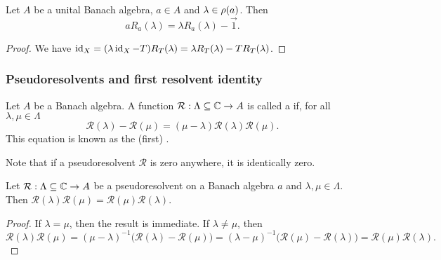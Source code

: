\begin{lemma} \label{BanachAlgebraResolventMultiplication}
Let $A$ be a unital Banach algebra, $a\in A$ and $\lambda\in\rho(a)$. Then
\[ aR_a(\lambda) = \lambda R_a(\lambda) - \vec{1}. \]
\end{lemma}
\begin{proof}
We have $\operatorname{id}_X = (\lambda \operatorname{id}_X - T)R_T(\lambda) = \lambda R_T(\lambda) - TR_T(\lambda)$.
\end{proof}

\subsubsection{Pseudoresolvents and first resolvent identity}
\begin{definition}
Let $A$ be a Banach algebra. A function $\mathcal{R}:\Lambda \subseteq \mathbb{C} \to A$ is called a  if, for all $\lambda,\mu\in\Lambda$
\[ \mathcal{R}(\lambda) - \mathcal{R}(\mu) = (\mu-\lambda)\mathcal{R}(\lambda)\mathcal{R}(\mu). \]
This equation is known as the (first) .
\end{definition}

Note that if a pseudoresolvent $\mathcal{R}$ is zero anywhere, it is identically zero.

\begin{lemma}
Let $\mathcal{R}:\Lambda \subseteq \mathbb{C} \to A$ be a pseudoresolvent on a Banach algebra $a$ and $\lambda,\mu\in\Lambda$. Then $\mathcal{R}(\lambda)\mathcal{R}(\mu) = \mathcal{R}(\mu)\mathcal{R}(\lambda)$.
\end{lemma}
\begin{proof}
If $\lambda = \mu$, then the result is immediate. If $\lambda \neq \mu$, then
\[ \mathcal{R}(\lambda)\mathcal{R}(\mu) = (\mu-\lambda)^{-1}\big(\mathcal{R}(\lambda) - \mathcal{R}(\mu)\big) = (\lambda - \mu)^{-1}\big(\mathcal{R}(\mu) - \mathcal{R}(\lambda)\big) = \mathcal{R}(\mu)\mathcal{R}(\lambda). \]
\end{proof}

